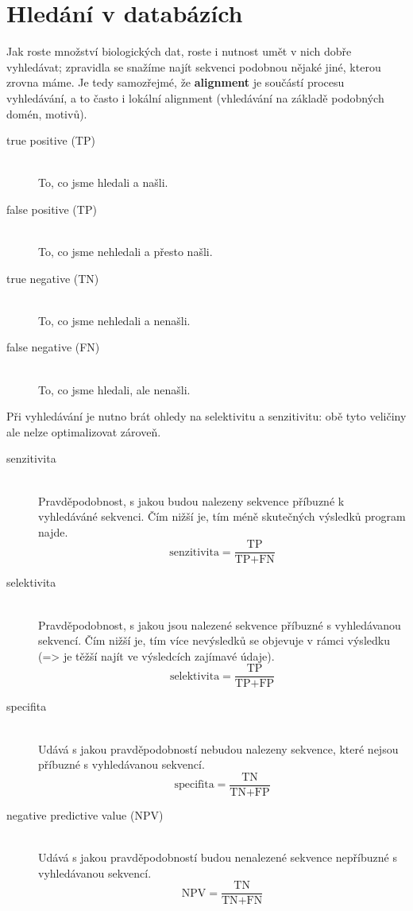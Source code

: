 \documentclass[DIV=8]{scrreprt}
\begin{document}
\chapter{Hledání v databázích} \label{Hledání v databázích}


Jak roste množství biologických dat, roste i nutnost umět v nich dobře vyhledávat; zpravidla se snažíme najít sekvenci podobnou nějaké jiné, kterou zrovna máme. Je tedy samozřejmé, že \textbf{alignment} je součástí procesu vyhledávání, a to často i lokální alignment (vhledávání na základě podobných domén, motivů).

\begin{description}
\item[true positive (TP)]\hfill \\
To, co jsme hledali a našli.


\item[false positive (TP)]\hfill \\
To, co jsme nehledali a přesto našli.


\item[true negative (TN)]\hfill \\
To, co jsme nehledali a nenašli.


\item[false negative (FN)]\hfill \\
To, co jsme hledali, ale nenašli.

\end{description}


Při vyhledávání je nutno brát ohledy na selektivitu a senzitivitu: obě tyto veličiny ale nelze optimalizovat zároveň.

\begin{description}
\item[senzitivita]\hfill \\
Pravděpodobnost, s jakou budou nalezeny sekvence příbuzné k vyhledáváné sekvenci. Čím nižší je, tím méně skutečných výsledků program najde.
\[\text{senzitivita} = \frac{\text{TP}}{\text{TP} + \text{FN}}\]


\item[selektivita]\hfill \\
Pravděpodobnost, s jakou jsou nalezené sekvence příbuzné s vyhledávanou sekvencí. Čím nižší je, tím více nevýsledků se objevuje v rámci výsledku (=> je těžší najít ve výsledcích zajímavé údaje).
\[\text{selektivita} = \frac{\text{TP}}{\text{TP} + \text{FP}}\]


\item[specifita]\hfill \\
Udává s jakou pravděpodobností nebudou nalezeny sekvence, které nejsou příbuzné s vyhledávanou sekvencí.
\[\text{specifita} = \frac{\text{TN}}{\text{TN} + \text{FP}}\]


\item[negative predictive value (NPV)]\hfill \\
Udává s jakou pravděpodobností budou nenalezené sekvence nepříbuzné s vyhledávanou sekvencí.
\[\text{NPV} = \frac{\text{TN}}{\text{TN} + \text{FN}}\]

\end{description}
\end{document}
